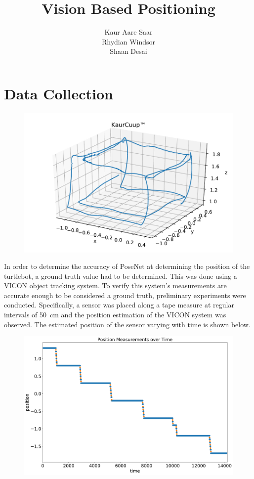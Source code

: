 \documentclass{article}
\author{Kaur Aare Saar \\ Rhydian Windsor \\ Shaan Desai}
\title{Vision Based Positioning}
\begin{document}
\maketitle
\section{Data Collection}

\begin{figure}[H]
  \centering
  \includegraphics[width=\textwidth]{../figures/KaurCuup.pdf}
\end{figure}

In order to determine the accuracy of PoseNet at determining the position of the turtlebot, a ground truth value had to be determined. This was done using a VICON object tracking system. To verify this system's measurements are accurate enough to be considered a ground truth, preliminary experiments were conducted. Specifically, a sensor was placed along a tape measure at regular intervals of \SI{50}{\centi\meter} and the position estimation of the VICON system was observed. The estimated position of the sensor  varying with time is shown below.

\begin{figure}[H]
  \centering
  \includegraphics[width=\textwidth]{../figures/pos.pdf}
\end{figure}
\end{document}
